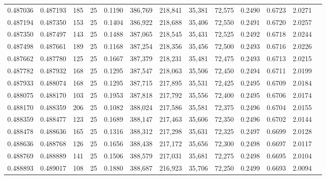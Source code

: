 \begin{tabular}{rrrrrrrrrrrrr}
0.487036 & 0.487193 &   185 &  25 &                                     0.1190 & 386,769 & 218,841 &  35,381 &  72,575 & 0.2490 & 0.6723 & 2.0271 \\
0.487194 & 0.487350 &   153 &  25 &                                     0.1404 & 386,922 & 218,688 &  35,406 &  72,550 & 0.2491 & 0.6720 & 2.0257 \\
0.487350 & 0.487497 &   143 &  25 &                                     0.1488 & 387,065 & 218,545 &  35,431 &  72,525 & 0.2492 & 0.6718 & 2.0244 \\
0.487498 & 0.487661 &   189 &  25 &                                     0.1168 & 387,254 & 218,356 &  35,456 &  72,500 & 0.2493 & 0.6716 & 2.0226 \\
0.487662 & 0.487780 &   125 &  25 &                                     0.1667 & 387,379 & 218,231 &  35,481 &  72,475 & 0.2493 & 0.6713 & 2.0215 \\
0.487782 & 0.487932 &   168 &  25 &                                     0.1295 & 387,547 & 218,063 &  35,506 &  72,450 & 0.2494 & 0.6711 & 2.0199 \\
0.487933 & 0.488074 &   168 &  25 &                                     0.1295 & 387,715 & 217,895 &  35,531 &  72,425 & 0.2495 & 0.6709 & 2.0184 \\
0.488075 & 0.488170 &   103 &  25 &                                     0.1953 & 387,818 & 217,792 &  35,556 &  72,400 & 0.2495 & 0.6706 & 2.0174 \\
0.488170 & 0.488359 &   206 &  25 &                                     0.1082 & 388,024 & 217,586 &  35,581 &  72,375 & 0.2496 & 0.6704 & 2.0155 \\
0.488359 & 0.488477 &   123 &  25 &                                     0.1689 & 388,147 & 217,463 &  35,606 &  72,350 & 0.2496 & 0.6702 & 2.0144 \\
0.488478 & 0.488636 &   165 &  25 &                                     0.1316 & 388,312 & 217,298 &  35,631 &  72,325 & 0.2497 & 0.6699 & 2.0128 \\
0.488636 & 0.488768 &   126 &  25 &                                     0.1656 & 388,438 & 217,172 &  35,656 &  72,300 & 0.2498 & 0.6697 & 2.0117 \\
0.488769 & 0.488889 &   141 &  25 &                                     0.1506 & 388,579 & 217,031 &  35,681 &  72,275 & 0.2498 & 0.6695 & 2.0104 \\
0.488893 & 0.489017 &   108 &  25 &                                     0.1880 & 388,687 & 216,923 &  35,706 &  72,250 & 0.2499 & 0.6693 & 2.0094 \\

\end{tabular}
